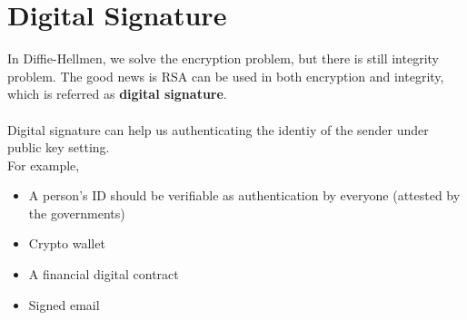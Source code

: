 \documentclass{scribe}
\begin{document}
\section{Digital Signature}
In Diffie-Hellmen, we solve the encryption problem, but there is still integrity problem. The good news is RSA can be used in both encryption and integrity, which is referred as \textbf{digital signature}.
\\\\
Digital signature can help us authenticating the identiy of the sender under public key setting.
\\
For example,
\begin{itemize}
    \item A person's ID should be verifiable as authentication by everyone (attested by the governments)
    \item Crypto wallet
    \item A financial digital contract
    \item Signed email
\end{itemize}
\vspace{10mm}
\end{document}

